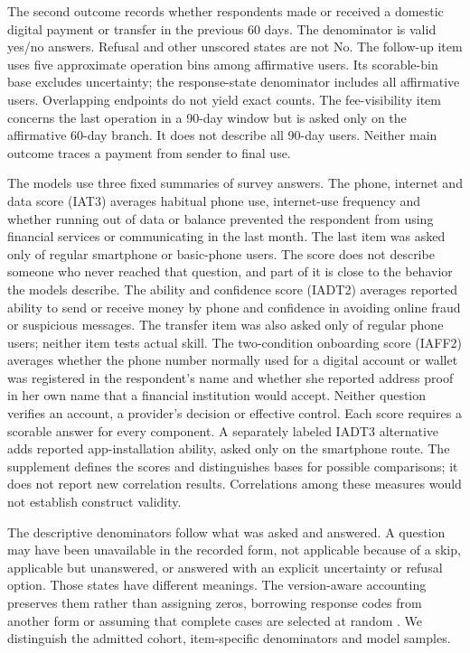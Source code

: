 The second outcome records whether respondents made or received a domestic digital payment or transfer in the previous 60 days. The denominator is valid yes/no answers. Refusal and other unscored states are not No. The follow-up item uses five approximate operation bins among affirmative users. Its scorable-bin base excludes uncertainty; the response-state denominator includes all affirmative users. Overlapping endpoints do not yield exact counts. The fee-visibility item concerns the last operation in a 90-day window but is asked only on the affirmative 60-day branch. It does not describe all 90-day users. Neither main outcome traces a payment from sender to final use.

The models use three fixed summaries of survey answers. The phone, internet and data score (IAT3) averages habitual phone use, internet-use frequency and whether running out of data or balance prevented the respondent from using financial services or communicating in the last month. The last item was asked only of regular smartphone or basic-phone users. The score does not describe someone who never reached that question, and part of it is close to the behavior the models describe. The ability and confidence score (IADT2) averages reported ability to send or receive money by phone and confidence in avoiding online fraud or suspicious messages. The transfer item was also asked only of regular phone users; neither item tests actual skill. The two-condition onboarding score (IAFF2) averages whether the phone number normally used for a digital account or wallet was registered in the respondent's name and whether she reported address proof in her own name that a financial institution would accept. Neither question verifies an account, a provider's decision or effective control. Each score requires a scorable answer for every component. A separately labeled IADT3 alternative adds reported app-installation ability, asked only on the smartphone route. The supplement defines the scores and distinguishes bases for possible comparisons; it does not report new correlation results. Correlations among these measures would not establish construct validity.

The descriptive denominators follow what was asked and answered. A question may have been unavailable in the recorded form, not applicable because of a skip, applicable but unanswered, or answered with an explicit uncertainty or refusal option. Those states have different meanings. The version-aware accounting preserves them rather than assigning zeros, borrowing response codes from another form or assuming that complete cases are selected at random \citep{rubin1976}. We distinguish the admitted cohort, item-specific denominators and model samples.

